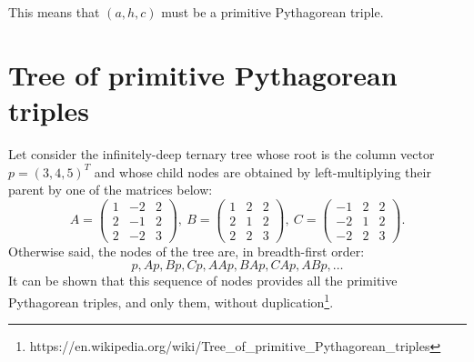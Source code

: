 \documentclass[11pt, twoside, a4paper]{article}
\begin{document}
This means that $(a, h, c)$ must be a primitive Pythagorean triple.

\section{Tree of primitive Pythagorean triples}
Let consider the infinitely-deep ternary tree whose root is the column vector $p=(3, 4, 5)^T$ and whose child nodes are obtained by left-multiplying their parent by one of the matrices below:
		\[
		A = \left(\begin{matrix}  1 & -2 & 2 \\  2 & -1 & 2 \\  2 & -2 & 3 \end{matrix} \right)\!,\ 
		B = \left(\begin{matrix}  1 &  2 & 2 \\  2 &  1 & 2 \\  2 &  2 & 3 \end{matrix} \right)\!,\
		C = \left(\begin{matrix} -1 &  2 & 2 \\ -2 &  1 & 2 \\ -2 &  2 & 3 \end{matrix} \right)\!.
		\]
Otherwise said, the nodes of the tree are, in breadth-first order:
\[p, Ap, Bp, Cp, AAp, BAp, CAp, ABp, \ldots\] 
It can be shown that this sequence of nodes provides all the primitive Pythagorean triples, and only them, without duplication\footnote{https://en.wikipedia.org/wiki/Tree\_of\_primitive\_Pythagorean\_triples}.
\end{document}
